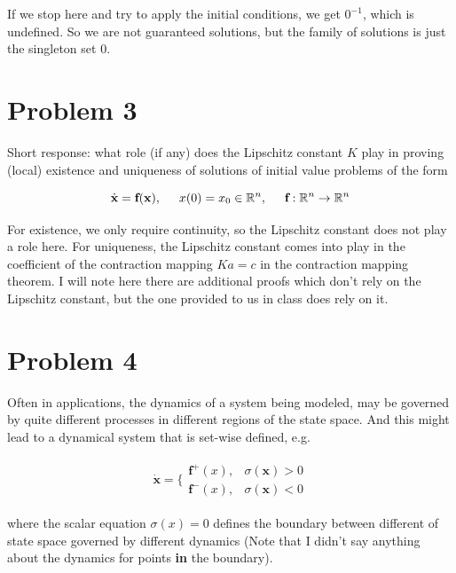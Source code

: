 \begin{solution}
    If we stop here and try to apply the initial conditions, we get $0^{-1}$, which is undefined. So we are not guaranteed solutions, but the family of solutions is just the singleton set {0}.
\end{solution}

\section{Problem 3}
 Short response: what role (if any) does the Lipschitz constant $K$ play in proving (local) existence and uniqueness of solutions of initial value problems of the form

\[
\dot{\textbf{x}} = \textbf{f}(\textbf{x}), \hspace{5mm} x(0) = x_0 \in \mathbb{R}^n, \hspace{5mm} \textbf{f} : \mathbb{R}^n \rightarrow \mathbb{R}^n 
\]

\partbreak
\begin{solution}

    For existence, we only require continuity, so the Lipschitz constant does not play a role here. For uniqueness, the Lipschitz constant comes into play in the coefficient of the contraction mapping $Ka = c$ in the contraction mapping theorem. I will note here there are additional proofs which don't rely on the Lipschitz constant, but the one provided to us in class does rely on it.    
\end{solution}

\newpage
\section{Problem 4}
Often in applications, the dynamics of a system being modeled, may be governed by quite different processes in different regions of the state space. And this might lead to a dynamical system that is set-wise defined, e.g.

    \begin{align}
        \dot{\textbf{x}} = 
        \Bigg\{\begin{array}{lr}
             \textbf{f}^+(x), &\sigma(\textbf{x}) > 0\\
             \textbf{f}^-(x), &\sigma(\textbf{x}) < 0
        \end{array}
        \label{p4: set dynamical system}
    \end{align}

    where the scalar equation $\sigma(x) = 0$ defines the boundary between different of state space governed by different dynamics (Note that I didn’t say anything about the dynamics for points \textbf{in} the boundary).
 
